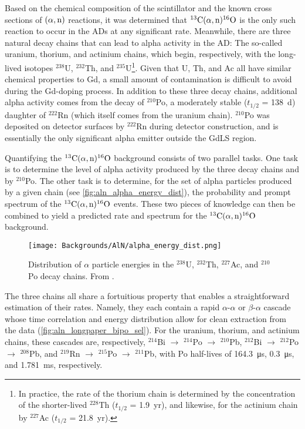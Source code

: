 \documentclass[../thesis.tex]{subfiles}
\begin{document}
Based on the chemical composition of the scintillator and the known cross sections of $(\alpha,\mathrm{n})$ reactions, it was determined that $^{13}\mathrm{C}(\alpha, \mathrm{n})^{16}\mathrm{O}$ is the only such reaction to occur in the ADs at any significant rate. Meanwhile, there are three natural decay chains that can lead to alpha activity in the AD: The so-called uranium, thorium, and actinium chains, which begin, respectively, with the long-lived isotopes $^{238}$U, $^{232}$Th, and $^{235}$U\footnote{In practice, the rate of the thorium chain is determined by the concentration of the shorter-lived $^{228}$Th ($t_{1/2}$ = 1.9~yr), and likewise, for the actinium chain by $^{227}$Ac ($t_{1/2}$ = 21.8~yr).}. Given that U, Th, and Ac all have similar chemical properties to Gd, a small amount of contamination is difficult to avoid during the Gd-doping process. In addition to these three decay chains, additional alpha activity comes from the decay of $^{210}$Po, a moderately stable ($t_{1/2}$ = 138~d) daughter of $^{222}$Rn (which itself comes from the uranium chain). $^{210}$Po was deposited on detector surfaces by $^{222}$Rn during detector construction, and is essentially the only significant alpha emitter outside the GdLS region.

Quantifying the $^{13}\mathrm{C}(\alpha, \mathrm{n})^{16}\mathrm{O}$ background consists of two parallel tasks. One task is to determine the level of alpha activity produced by the three decay chains and by $^{210}$Po. The other task is to determine, for the set of alpha particles produced by a given chain (see \autoref{fig:aln_alpha_energy_dist}), the probability and prompt spectrum of the $^{13}\mathrm{C}(\alpha, \mathrm{n})^{16}\mathrm{O}$ events. These two pieces of knowledge can then be combined to yield a predicted rate and spectrum for the $^{13}\mathrm{C}(\alpha, \mathrm{n})^{16}\mathrm{O}$ background.

\begin{figure}[ht]
  \texttt{[image: Backgrounds/AlN/alpha\_energy\_dist.png]}
  \caption{Distribution of $\alpha$ particle energies in the $^{238}$U, $^{232}$Th, $^{227}$Ac, and $^{210}$Po decay chains. From \cite{Zhao_2014}.}
  \label{fig:aln_alpha_energy_dist}
\end{figure}

The three chains all share a fortuitious property that enables a straightforward estimation of their rates. Namely, they each contain a rapid $\alpha$-$\alpha$ or $\beta$-$\alpha$ cascade whose time correlation and energy distribution allow for clean extraction from the data (\autoref{fig:aln_longpaper_bipo_sel}). For the uranium, thorium, and actinium chains, these cascades are, respectively, $^{214}$Bi $\to$ $^{214}$Po $\to$ $^{210}$Pb, $^{212}$Bi $\to$ $^{212}$Po $\to$ $^{208}$Pb, and $^{219}$Rn $\to$ $^{215}$Po $\to$ $^{211}$Pb, with Po half-lives of \SI{164.3}{\micro s}, \SI{0.3}{\micro s}, and \SI{1.781}{ms}, respectively.
\end{document}
